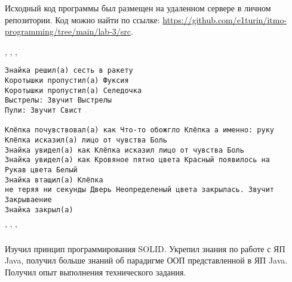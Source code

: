 Исходный код программы был размещен на удаленном сервере в личном репозитории. Код можно найти по ссылке: \url{https://github.com/e1turin/itmo-programming/tree/main/lab-3/src}.


\begin{center}
, , ,
\end{center}
\begin{verbatim}
Знайка решил(а) сесть в ракету
Коротышки пропустил(а) Фуксия
Коротышки пропустил(а) Селедочка
Выстрелы: Звучит Выстрелы
Пули: Звучит Свист

Клёпка почувствовал(а) как Что-то обожгло Клёпка а именно: руку
Клёпка исказил(а) лицо от чувства Боль
Знайка увидел(а) как Клёпка исказил лицо от чувства Боль
Знайка увидел(а) как Кровяное пятно цвета Красный появилось на 
Рукав цвета Белый
Знайка втащил(а) Клёпка
не теряя ни секунды Дверь Неопределеный цвета закрылась. Звучит 
Закрываение
Знайка закрыл(a)
\end{verbatim}
\begin{center}
' ' '
\end{center}

Изучил принцип программирования SOLID. Укрепил знания по работе с ЯП Java, получил больше знаний об парадигме ООП представленной в ЯП Java. Получил опыт выполнения технического задания.\\
\newpage





